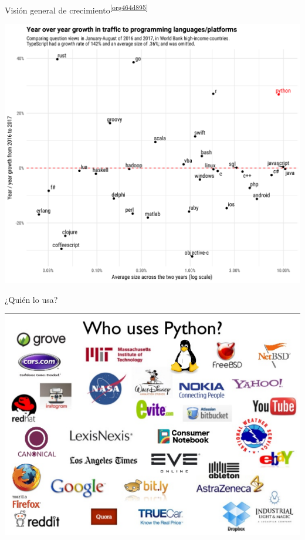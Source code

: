 \documentclass[bigger,unknownkeysallowed]{beamer}
\begin{document}
\begin{frame}[label={sec:orgd2da2cc}]{Visión general de crecimiento\textsuperscript{\ref{org464d895}}}
\begin{center}
\includegraphics[height=.7\textheight]{tag_grown.png}
\end{center}
\end{frame}

\begin{frame}[label={sec:org0a174f7}]{¿Quién lo usa?}
\begin{center}
\includegraphics[width=\textwidth]{quienlousa.png}
\end{center}
\end{frame}
\end{document}
